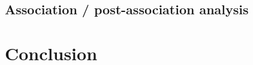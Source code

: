 \documentclass[a4paper, 12pt]{article}
\begin{document}
\subsection{Association / post-association analysis}


\section{Conclusion}


\nocite{*}



\end{document}
